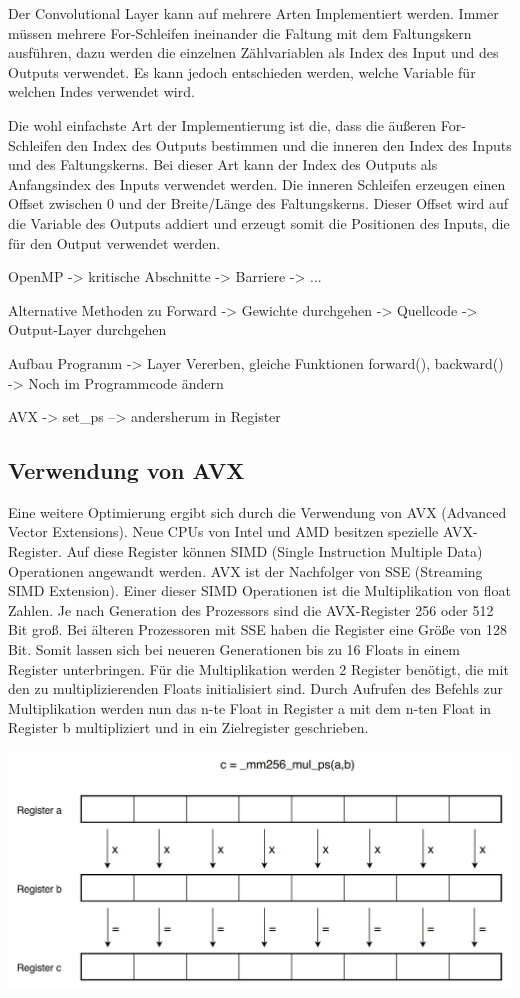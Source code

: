 \documentclass[../main.tex]{subfiles}
\begin{document}
Der Convolutional Layer kann auf mehrere Arten Implementiert werden. Immer müssen mehrere For-Schleifen ineinander die Faltung mit dem Faltungskern ausführen, dazu werden die einzelnen Zählvariablen als Index des Input und des Outputs verwendet. Es kann jedoch entschieden werden, welche Variable für welchen Indes verwendet wird.

Die wohl einfachste Art der Implementierung ist die, dass die äußeren For-Schleifen den Index des Outputs bestimmen und die inneren den Index des Inputs und des Faltungskerns. Bei dieser Art kann der Index des Outputs als Anfangsindex des Inputs verwendet werden. Die inneren Schleifen erzeugen einen Offset zwischen 0 und der Breite/Länge des Faltungskerns. Dieser Offset wird auf die Variable des Outputs addiert und erzeugt somit die Positionen des Inputs, die für den Output verwendet werden.

OpenMP
-> kritische Abschnitte
-> Barriere
-> ...

Alternative Methoden zu Forward
-> Gewichte durchgehen
-> Quellcode
-> Output-Layer durchgehen

Aufbau Programm
-> Layer Vererben, gleiche Funktionen forward(), backward()
-> Noch im Programmcode ändern

AVX
-> set\_ps --> andersherum in Register



\subsection{Verwendung von AVX}

Eine weitere Optimierung ergibt sich durch die Verwendung von AVX (Advanced Vector Extensions).  Neue CPUs von Intel und AMD besitzen spezielle AVX-Register. Auf diese Register können SIMD (Single Instruction Multiple Data) Operationen angewandt werden. AVX ist der Nachfolger von SSE (Streaming SIMD Extension). Einer dieser SIMD Operationen ist die Multiplikation von float Zahlen.
Je nach Generation des Prozessors sind die AVX-Register 256 oder 512 Bit groß. Bei älteren Prozessoren mit SSE haben die Register eine Größe von 128 Bit. Somit lassen sich bei neueren Generationen bis zu 16 Floats in einem Register unterbringen. Für die Multiplikation werden 2 Register benötigt, die mit den zu multiplizierenden Floats initialisiert sind. Durch Aufrufen des Befehls zur Multiplikation werden nun das n-te Float in Register a mit dem n-ten Float in Register b multipliziert und in ein Zielregister geschrieben.

\includegraphics[width=\textwidth]{../images/Benz/avx.png}
\end{document}
